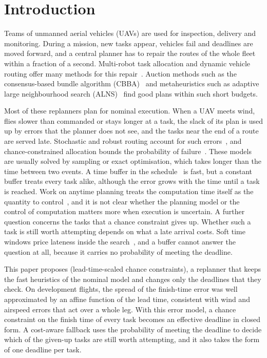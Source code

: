 \section{Introduction}\label{sec:intro}
Teams of unmanned aerial vehicles (UAVs) are used for inspection, delivery and monitoring. During a mission, new tasks
appear, vehicles fail and deadlines are moved forward, and a central planner has to repair the routes of the whole fleet
within a fraction of a second. Multi-robot task allocation and dynamic vehicle routing offer many methods for this
repair~\cite{gerkey2004formal,psaraftis2016dynamic,soeffker2022review,skaltsis2023review}. Auction methods such as the
consensus-based bundle algorithm (CBBA)~\cite{choi2009consensus} and metaheuristics such as adaptive large
neighbourhood search (ALNS)~\cite{ropke2006adaptive} find good plans within such short budgets.

Most of these replanners plan for nominal execution. When a UAV meets wind, flies slower than commanded or stays longer
at a task, the slack of its plan is used up by errors that the planner does not see, and the tasks near the end of a
route are served late. Stochastic and robust routing account for such
errors~\cite{agra2013robust,ehmke2015ensuring,rostami2021correlated,cheng2024weather}, and chance-constrained
allocation bounds the probability of failure~\cite{ponda2012chance,gao2025drcc}. These models are usually solved by
sampling or exact optimisation, which takes longer than the time between two events. A time buffer in the
schedule~\cite{jabali2015selfimposed} is fast, but a constant buffer treats every task alike, although the error grows
with the time until a task is reached. Work on anytime
planning treats the computation time itself as the quantity to
control~\cite{zilberstein1996using,svegliato2018meta,herrmann2023metareasoning}, and it is not clear whether the
planning model or the control of computation matters more when execution is uncertain. A further question concerns the
tasks that a chance constraint gives up. Whether such a task is still worth attempting depends on what a late arrival
costs. Soft time windows price lateness inside the search~\cite{tas2013stochastic}, and a buffer cannot answer the
question at all, because it carries no probability of meeting the deadline.

This paper proposes \mname{} (lead-time-scaled chance constraints), a replanner that keeps the fast heuristics of the
nominal model and changes only the deadlines that they check. On development flights, the spread of the finish-time
error was well approximated by an affine function of the lead time, consistent with wind and airspeed errors that act
over a whole leg. With this error model, a chance constraint on the finish time of every task becomes an effective deadline in closed form. A cost-aware fallback
uses the probability of meeting the deadline to decide which of the given-up tasks are still worth attempting, and it
also takes the form of one deadline per task.

